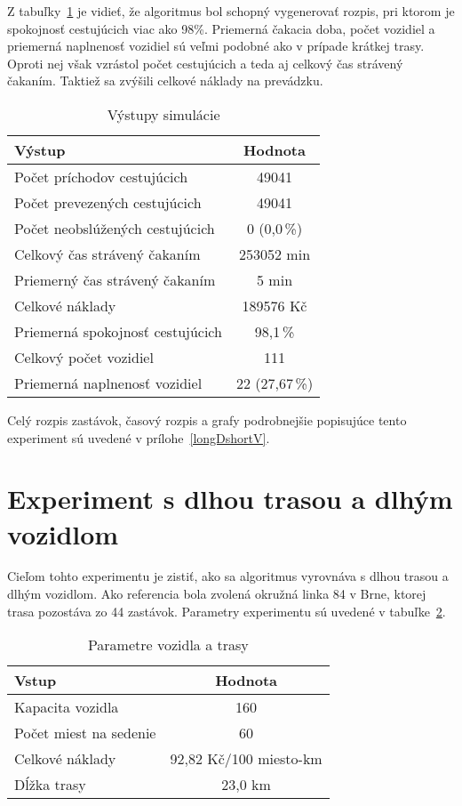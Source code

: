 Z tabuľky~\ref{tab:longDshortVout} je vidieť, že algoritmus bol schopný vygenerovať rozpis, pri ktorom je spokojnosť cestujúcich viac ako 98\%.
Priemerná čakacia doba, počet vozidiel a priemerná naplnenosť vozidiel sú veľmi podobné ako v prípade krátkej trasy.
Oproti nej však vzrástol počet cestujúcich a teda aj celkový čas strávený čakaním.
Taktiež sa zvýšili celkové náklady na prevádzku.

\begin{table}[h]
  \centering
  \begin{tabular}{|l|c|}
    \hline
      \textbf{Výstup} & \textbf{Hodnota} \\ \hline
        Počet príchodov cestujúcich & 49041 \\ \hline
        Počet prevezených cestujúcich & 49041 \\ \hline
        Počet neobslúžených cestujúcich & 0 (0,0\,\%) \\ \hline
        Celkový čas strávený čakaním & 253052 min \\ \hline
        Priemerný čas strávený čakaním & 5 min \\ \hline
        Celkové náklady & 189576 Kč \\ \hline
        Priemerná spokojnosť cestujúcich & 98,1\,\% \\ \hline
        Celkový počet vozidiel & 111 \\ \hline
        Priemerná naplnenosť vozidiel & 22 (27,67\,\%) \\ \hline
  \end{tabular}
  \caption{Výstupy simulácie}
  \label{tab:longDshortVout}
\end{table}

Celý rozpis zastávok, časový rozpis a grafy podrobnejšie popisujúce tento experiment sú uvedené v prílohe~\ref{longDshortV}.

\newpage
\section{Experiment s dlhou trasou a dlhým vozidlom}
Cieľom tohto experimentu je zistiť, ako sa algoritmus vyrovnáva s dlhou trasou a dlhým vozidlom.
Ako referencia bola zvolená okružná linka 84 v Brne, ktorej trasa pozostáva zo 44 zastávok.
Parametry experimentu sú uvedené v tabuľke~\ref{tab:longDlongVin}.

\begin{table}[h]
  \centering
  \begin{tabular}{|l|c|}
    \hline
    \textbf{Vstup} & \textbf{Hodnota} \\ \hline
    Kapacita vozidla & 160 \\ \hline
    Počet miest na sedenie & 60 \\ \hline
    Celkové náklady & 92,82 Kč/100 miesto-km \\ \hline
    Dĺžka trasy & 23,0 km \\ \hline
  \end{tabular}
  \caption{Parametre vozidla a trasy}
  \label{tab:longDlongVin}
\end{table}

